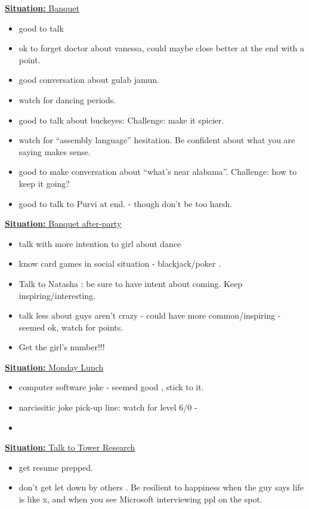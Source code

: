 \documentclass[11pt]{article}
\newcommand{\newSituation}[1]{\underline{\textbf{Situation:} #1} }
\begin{document}
\newSituation{Banquet} 
\begin{itemize} 
\item good to talk 
\item ok to forget doctor about vanessa, could maybe close better at the end with a point.
\item good conversation about gulab jamun. 
\item watch for dancing periods. 
 
\item good to talk about buckeyes: Challenge: make it spicier. 

\item watch for ``assembly language'' hesitation. Be confident about what you are saying makes sense. 

\item good to make conversation about ``what's near alabama''. Challenge: how to keep it going? 
\item good to talk to Purvi at end. - though don't be too harsh. 

\end{itemize} 

\newSituation{Banquet after-party} 
\begin{itemize} 
\item talk with more intention to girl about dance 
\item know card games in social situation - blackjack/poker . 
\item Talk to Natasha : be sure to have intent about coming.  Keep inspiring/interesting. 

\item talk less about guys aren't crazy - could have more common/inspiring - seemed ok, watch for points.  
\item Get the girl's number!!! 
\end{itemize} 

\newSituation{Monday Lunch} 
\begin{itemize} 
\item computer software joke - seemed good , stick to it. 
\item narcissitic joke pick-up line: watch for level 6/0 - 
\item 
\end{itemize}  


\newSituation{Talk to Tower Research} 
\begin{itemize} 
\item get resume prepped. 
\item don't get let down by others .  Be resilient to happiness when the guy says life is like x, and when you see Microsoft interviewing ppl on the spot. 
\end{itemize} 
\end{document}
